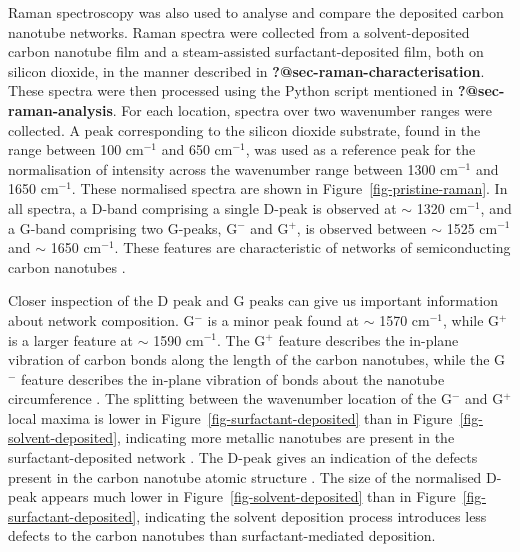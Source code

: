 \documentclass[
  a4paper,
]{scrbook}
\begin{document}
Raman spectroscopy was also used to analyse and compare the deposited
carbon nanotube networks. Raman spectra were collected from a
solvent-deposited carbon nanotube film and a steam-assisted
surfactant-deposited film, both on silicon dioxide, in the manner
described in \textbf{?@sec-raman-characterisation}. These spectra were
then processed using the Python script mentioned in
\textbf{?@sec-raman-analysis}. For each location, spectra over two
wavenumber ranges were collected. A peak corresponding to the silicon
dioxide substrate, found in the range between 100 cm\(^{-1}\) and 650
cm\(^{-1}\), was used as a reference peak for the normalisation of
intensity across the wavenumber range between 1300 cm\(^{-1}\) and 1650
cm\(^{-1}\). These normalised spectra are shown in
Figure~\ref{fig-pristine-raman}. In all spectra, a D-band comprising a
single D-peak is observed at \(\sim\) 1320 cm\(^{-1}\), and a G-band
comprising two G-peaks, G\(^-\) and G\(^+\), is observed between
\(\sim\) 1525 cm\(^{-1}\) and \(\sim\) 1650 cm\(^{-1}\). These features
are characteristic of networks of semiconducting carbon nanotubes
\autocite{Dresselhaus2005,King2014}.

Closer inspection of the D peak and G peaks can give us important
information about network composition. G\(^-\) is a minor peak found at
\(\sim\) 1570 cm\(^{-1}\), while G\(^+\) is a larger feature at \(\sim\)
1590 cm\(^{-1}\). The G\(^+\) feature describes the in-plane vibration
of carbon bonds along the length of the carbon nanotubes, while the
G\(^-\) feature describes the in-plane vibration of bonds about the
nanotube circumference \autocite{King2014,Swiniarski2021}. The splitting
between the wavenumber location of the G\(^-\) and G\(^+\) local maxima
is lower in Figure~\ref{fig-surfactant-deposited} than in
Figure~\ref{fig-solvent-deposited}, indicating more metallic nanotubes
are present in the surfactant-deposited network
\autocite{Swiniarski2021}. The D-peak gives an indication of the defects
present in the carbon nanotube atomic structure
\autocite{King2014,Swiniarski2021}. The size of the normalised D-peak
appears much lower in Figure~\ref{fig-solvent-deposited} than in
Figure~\ref{fig-surfactant-deposited}, indicating the solvent deposition
process introduces less defects to the carbon nanotubes than
surfactant-mediated deposition.
\end{document}

